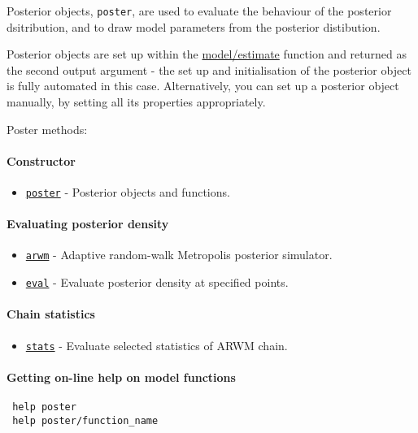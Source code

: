 


	Posterior objects, \texttt{poster}, are used to evaluate the behaviour
 of the posterior dsitribution, and to draw model parameters from the
 posterior distibution.
 
 Posterior objects are set up within the \url{model/estimate} function
 and returned as the second output argument - the set up and
 initialisation of the posterior object is fully automated in this case.
 Alternatively, you can set up a posterior object manually, by setting
 all its properties appropriately.
 
 Poster methods:
 
 \paragraph{Constructor}
 
 \begin{itemize}
 \item
   \href{poster/poster}{\texttt{poster}} - Posterior objects and
   functions.
 \end{itemize}
 
 \paragraph{Evaluating posterior density}
 
 \begin{itemize}
 \item
   \href{poster/arwm}{\texttt{arwm}} - Adaptive random-walk Metropolis
   posterior simulator.
 \item
   \href{poster/eval}{\texttt{eval}} - Evaluate posterior density at
   specified points.
 \end{itemize}
 
 \paragraph{Chain statistics}
 
 \begin{itemize}
 \item
   \href{poster/stats}{\texttt{stats}} - Evaluate selected statistics of
   ARWM chain.
 \end{itemize}
 
 \paragraph{Getting on-line help on model functions}
 
 \begin{verbatim}
 help poster
 help poster/function_name
 \end{verbatim}


